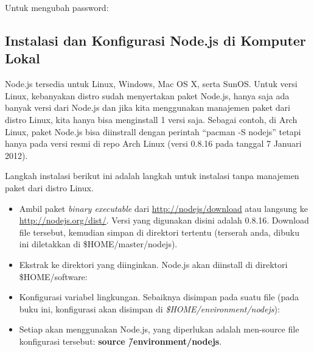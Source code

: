 Untuk mengubah password:

\lstset{language=bash,caption=Mengubah password server}


\subsection{Instalasi dan Konfigurasi Node.js di Komputer Lokal}

Node.js tersedia untuk Linux, Windows, Mac OS X, serta SunOS. Untuk versi Linux, kebanyakan distro sudah menyertakan paket Node.js, hanya saja ada banyak versi dari Node.js dan jika kita menggunakan manajemen paket dari distro Linux, kita hanya bisa menginstall 1 versi saja. Sebagai contoh, di Arch Linux, paket Node.js bisa diinstrall dengan perintah ``pacman -S nodejs'' tetapi hanya pada versi resmi di repo Arch Linux (versi 0.8.16 pada tanggal 7 Januari 2012). 

Langkah instalasi berikut ini adalah langkah untuk instalasi tanpa manajemen paket dari distro Linux.
\begin{itemize}
  \item Ambil paket \textit{binary executable} dari \url{http://nodejs/download} atau langsung ke \url{http://nodejs.org/dist/}. Versi yang digunakan disini adalah 0.8.16. Download file tersebut, kemudian simpan di direktori tertentu (terserah anda, dibuku ini diletakkan di \$HOME/master/nodejs).

\lstset{language=bash,caption=Hasil dari download Node.js}


  \item Ekstrak ke direktori yang diinginkan. Node.js akan diinstall di direktori \$HOME/software:

\lstset{language=bash,caption=Ekstraksi Node.js}


  \item Konfigurasi variabel lingkungan. Sebaiknya disimpan pada suatu file (pada buku ini, konfigurasi akan disimpan di \textit{\$HOME/environment/nodejs}):

\lstset{language=bash,caption=Konfigurasi variabel lingkungan Node.js}


  \item Setiap akan menggunakan Node.js, yang diperlukan adalah men-source file konfigurasi tersebut: \textbf{source \~/environment/nodejs}.
\end{itemize}


